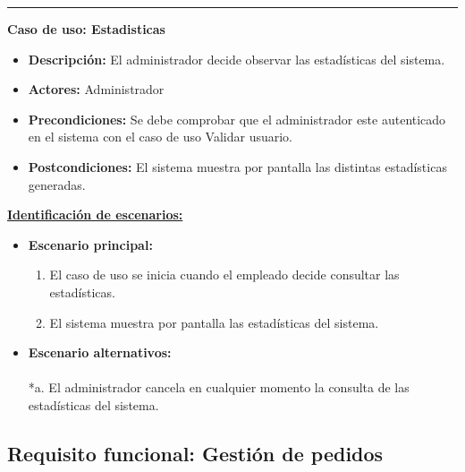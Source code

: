 \smallskip
\hrule height 1pt
\smallskip
\textbf{Caso de uso: Estadisticas}
\begin{itemize}\renewcommand{\labelitemi}{$\cdot$}
  \item \textbf{Descripción:} El administrador decide observar las estadísticas del sistema.
  \item \textbf{Actores:} Administrador
  \item \textbf{Precondiciones:} Se debe comprobar que el administrador este autenticado en el sistema con el caso de uso Validar usuario.
  \item \textbf{Postcondiciones:} El sistema muestra por pantalla las distintas estadísticas generadas.
\end{itemize}
\underline{\textbf{Identificación de escenarios:}}
\begin{itemize}\renewcommand{\labelitemi}{$\circ$}
 \item \textbf{Escenario principal:}
         \begin{enumerate}
          \item El caso de uso se inicia cuando el empleado decide consultar las estadísticas.
          \item El sistema muestra por pantalla las estadísticas del sistema.
         \end{enumerate}
  \item \textbf{Escenario alternativos:}\\\\
          *a. El administrador cancela en cualquier momento la consulta de las estadísticas del sistema.
\end{itemize}

\subsection{Requisito funcional: Gestión de pedidos}


